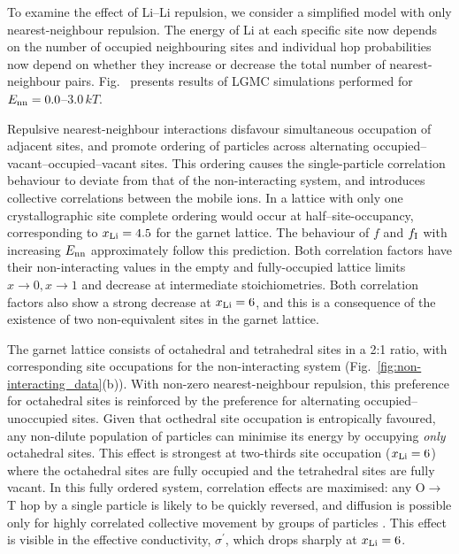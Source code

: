 \documentclass[aps,prb,twocolumn,superscriptaddress,reprint]{revtex4-1}
\newcommand{\xLi}{x_\m{Li}}
\begin{document}
To examine the effect of Li--Li repulsion, we consider a simplified model with only nearest-neighbour repulsion. 
The energy of Li at each specific site now depends on the number of occupied neighbouring sites and individual hop probabilities now depend on whether they increase or decrease the total number of nearest-neighbour pairs. 
Fig.~ presents results of LGMC simulations performed for $E_{\mathrm{nn}}=0.0$--$3.0\,kT$. 

Repulsive nearest-neighbour interactions disfavour simultaneous occupation of adjacent sites, and promote ordering of particles across alternating  occupied--vacant--occupied--vacant sites.
This ordering causes the single-particle correlation behaviour to deviate from that of the non-interacting system, and introduces collective correlations between the mobile ions. 
In a lattice with only one crystallographic site complete ordering would occur at half--site-occupancy, corresponding to $\xLi=4.5$ for the garnet lattice. 
The behaviour of $f$ and $f_{\mathrm{I}}$ with increasing $E_{\mathrm{nn}}$ approximately follow this prediction. 
Both correlation factors have their non-interacting values in the empty and fully-occupied lattice limits $x\to0,x\to1$ and decrease at intermediate stoichiometries. 
Both correlation factors also show a strong decrease at $\xLi=6$, and this is a consequence of the existence of two non-equivalent sites in the garnet lattice. 

The garnet lattice consists of octahedral and tetrahedral sites in a 2:1 ratio, with corresponding site occupations for the non-interacting system (Fig.\ \ref{fig:non-interacting_data}(b)). 
With non-zero nearest-neighbour repulsion, this preference for octahedral sites is reinforced by the preference for alternating occupied--unoccupied sites. 
Given that octhedral site occupation is entropically favoured, any non-dilute population of particles can minimise its energy by occupying \emph{only} octahedral sites. 
This effect is strongest at two-thirds site occupation ($\xLi=6$) where the octahedral sites are fully occupied and the tetrahedral sites are fully vacant. 
In this fully ordered system, correlation effects are maximised: any O$\to$T hop by a single particle is likely to be quickly reversed, and diffusion is possible only for highly correlated collective movement by groups of particles \cite{BurbanoEtAl_PhysRevLett2016}. 
This effect is visible in the effective conductivity, $\sigma^\prime$, which drops sharply at $\xLi=6$.
\end{document}
